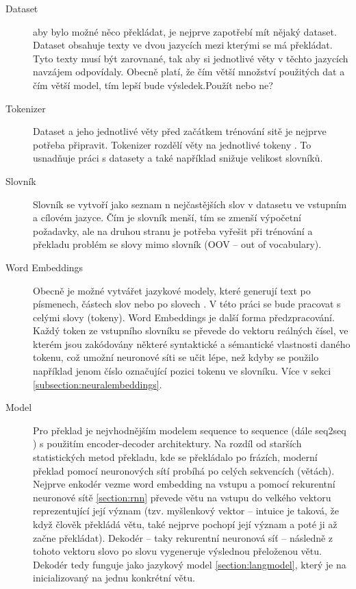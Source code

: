\begin{description}
  \item[Dataset] aby bylo možné něco překládat, je nejprve zapotřebí mít nějaký dataset. Dataset obsahuje texty ve dvou jazycích mezi kterými se má překládat. Tyto texty musí být zarovnané, tak aby si jednotlivé věty v těchto jazycích navzájem odpovídaly. Obecně platí, že čím větší množství použitých dat a čím větší model, tím lepší bude výsledek.Použít nebo ne?\cite{googleLimits}

  \item[Tokenizer] Dataset a jeho jednotlivé věty před začátkem trénování sitě je nejprve potřeba připravit. Tokenizer rozdělí věty na jednotlivé tokeny . To usnadňuje práci s datasety a také například snižuje velikost slovníků.

  \item[Slovník] Slovník se vytvoří jako seznam n nejčastějších slov v datasetu ve vstupním a cílovém jazyce. Čím je slovník menší, tím se zmenší výpočetní požadavky, ale na druhou stranu je potřeba vyřešit při trénování a překladu problém se slovy mimo slovník (OOV -- out of vocabulary). 

  \item[Word Embeddings] Obecně je možné vytvářet jazykové modely, které generují text po písmenech, částech slov nebo po slovech \cite{mikolovSubwords}. V této práci se bude pracovat s celými slovy (tokeny). Word Embeddings je další forma předzpracování. Každý token ze vstupního slovníku se převede do vektoru reálných čísel, ve kterém jsou zakódovány některé syntaktické a sémantické vlastnosti daného tokenu, což umožní neuronové síti se učit lépe, než kdyby se použilo například jenom číslo označující pozici tokenu ve slovníku.  Více v sekci \ref{subsection:neuralembeddings}.

  \item[Model] Pro překlad je nejvhodnějším modelem sequence to sequence (dále seq2seq \cite{seq2seq}) s použitím encoder-decoder architektury. Na rozdíl od starších statistických metod překladu, kde se překládalo po frázích, moderní překlad pomocí neuronových sítí probíhá po celých sekvencích (větách). Nejprve enkodér vezme word embedding na vstupu a pomocí rekurentní neuronové sítě \ref{section:rnn} převede větu na vstupu do velkého vektoru reprezentující její význam (tzv. myšlenkový vektor -- intuice je taková, že když člověk překládá větu, také nejprve pochopí její význam a poté ji až začne překládat). Dekodér -- taky rekurentní neuronová síť -- následně z tohoto vektoru slovo po slovu vygeneruje výslednou přeloženou větu. Dekodér tedy funguje jako jazykový model \ref{section:langmodel}, který je na inicializovaný na jednu konkrétní větu.
\end{description}



